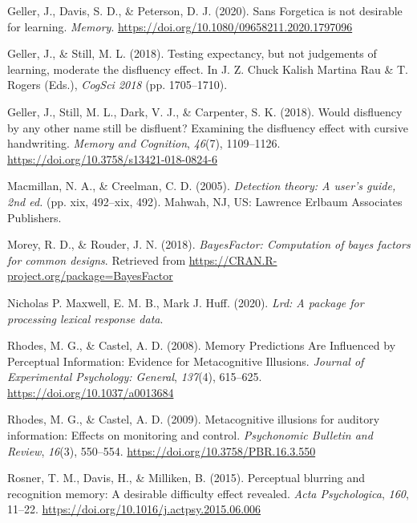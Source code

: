 \documentclass[
  english,
  jou]{apa6}
\begin{document}
\leavevmode\hypertarget{ref-Geller2020}{}%
Geller, J., Davis, S. D., \& Peterson, D. J. (2020). Sans Forgetica is not desirable for learning. \emph{Memory}. \url{https://doi.org/10.1080/09658211.2020.1797096}

\leavevmode\hypertarget{ref-cogsci18-Geller}{}%
Geller, J., \& Still, M. L. (2018). Testing expectancy, but not judgements of learning, moderate the disfluency effect. In J. Z. Chuck Kalish Martina Rau \& T. Rogers (Eds.), \emph{CogSci 2018} (pp. 1705--1710).

\leavevmode\hypertarget{ref-Geller2018}{}%
Geller, J., Still, M. L., Dark, V. J., \& Carpenter, S. K. (2018). Would disfluency by any other name still be disfluent? Examining the disfluency effect with cursive handwriting. \emph{Memory and Cognition}, \emph{46}(7), 1109--1126. \url{https://doi.org/10.3758/s13421-018-0824-6}

\leavevmode\hypertarget{ref-Macmillan2005}{}%
Macmillan, N. A., \& Creelman, C. D. (2005). \emph{Detection theory: A user's guide, 2nd ed.} (pp. xix, 492--xix, 492). Mahwah, NJ, US: Lawrence Erlbaum Associates Publishers.

\leavevmode\hypertarget{ref-Morey2018}{}%
Morey, R. D., \& Rouder, J. N. (2018). \emph{BayesFactor: Computation of bayes factors for common designs}. Retrieved from \url{https://CRAN.R-project.org/package=BayesFactor}

\leavevmode\hypertarget{ref-Maxwell2020}{}%
Nicholas P. Maxwell, E. M. B., Mark J. Huff. (2020). \emph{Lrd: A package for processing lexical response data}.

\leavevmode\hypertarget{ref-Rhodes2008}{}%
Rhodes, M. G., \& Castel, A. D. (2008). Memory Predictions Are Influenced by Perceptual Information: Evidence for Metacognitive Illusions. \emph{Journal of Experimental Psychology: General}, \emph{137}(4), 615--625. \url{https://doi.org/10.1037/a0013684}

\leavevmode\hypertarget{ref-Rhodes2009}{}%
Rhodes, M. G., \& Castel, A. D. (2009). Metacognitive illusions for auditory information: Effects on monitoring and control. \emph{Psychonomic Bulletin and Review}, \emph{16}(3), 550--554. \url{https://doi.org/10.3758/PBR.16.3.550}

\leavevmode\hypertarget{ref-Rosner2015}{}%
Rosner, T. M., Davis, H., \& Milliken, B. (2015). Perceptual blurring and recognition memory: A desirable difficulty effect revealed. \emph{Acta Psychologica}, \emph{160}, 11--22. \url{https://doi.org/10.1016/j.actpsy.2015.06.006}
\end{document}
